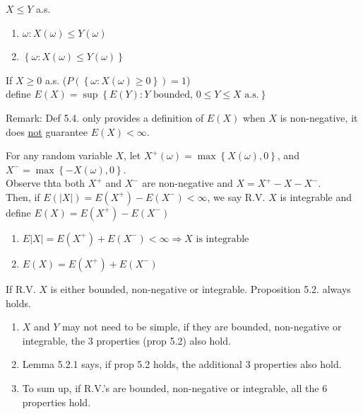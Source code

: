 $X \leq Y$ a.s.
\begin{enumerate}[label = "step "]
    \item $\omega: X(\omega) \leq Y(\omega)$
    \item $\left\{ \omega: X(\omega) \leq Y(\omega)\right\}$
\end{enumerate}

\begin{definition}
    If $X \geq 0$ a.s. ($P(\left\{\omega: X(\omega)\geq 0\right\}) = 1$)
    \\define $E(X) = \sup \left\{E(Y): Y\text{ bounded, } 0\leq Y \leq X \text{ a.s.}\right\}$
\end{definition}

Remark: Def 5.4. only provides a definition of $E(X)$ when $X$ is non-negative, it does \underline{not} guarantee $E(X) < \infty$.

\begin{definition}
    For any random variable $X$, let $X^+(\omega) = \max\left\{X(\omega), 0\right\}$, and $X^- = \max\left\{-X(\omega), 0\right\}$.
    \\Observe thta both $X^+$ and $X^-$ are non-negative and $X=X^+ - X- X^-$.
    \\Then, if $E(|X|) = E(X^+) -E(X^-) < \infty$, we say R.V. $X$ is integrable and define $E(X) = E(X^+) - E(X^-)$
\end{definition}

\begin{enumerate}
    \item $E|X| = E(X^+)+E(X^-) < \infty \Rightarrow X \text{ is integrable}$
    \item $E(X) = E(X^+) + E(X^-)$
\end{enumerate}

\begin{proposition}
    If R.V. $X$ is either bounded, non-negative or integrable. Proposition 5.2. always holds.
\end{proposition}
\begin{enumerate}
    \item $X$ and $Y$ may not need to be simple, if they are bounded, non-negative or integrable, the 3 properties (prop 5.2) also hold.
    \item Lemma 5.2.1 says, if prop 5.2 holds, the additional 3 properties also hold.
    \item To sum up, if R.V.'s are bounded, non-negative or integrable, all the 6 properties hold.
\end{enumerate}

